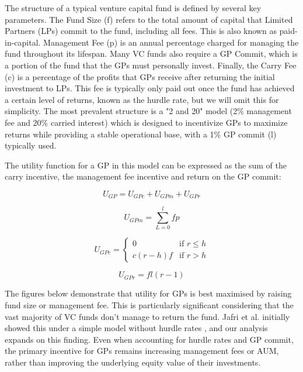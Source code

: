 \documentclass[a4paper, oneside]{discothesis}
\begin{document}
The structure of a typical venture capital fund is defined by several key parameters. The Fund Size (f) refers to the total amount of capital that Limited Partners (LPs) commit to the fund, including all fees. This is also known as paid-in-capital. Management Fee (p) is an annual percentage charged for managing the fund throughout its lifespan. Many VC funds also require a GP Commit, which is a portion of the fund that the GPs must personally invest. Finally, the Carry Fee (c) is a percentage of the profits that GPs receive after returning the initial investment to LPs. This fee is typically only paid out once the fund has achieved a certain level of returns, known as the hurdle rate, but we will omit this for simplicity. The most prevalent structure is a "2 and 20" model (2\% management fee and 20\% carried interest) which is designed to incentivize GPs to maximize returns while providing a stable operational base, with a 1\% GP commit (l) typically used. 

The utility function for a GP in this model can be expressed as the sum of the carry incentive, the management fee incentive and return on the GP commit:

\begin{equation}
U_{GP} = U_{GPc} + U_{GPm} + U_{GPr}
\end{equation}

\begin{equation}
U_{GPm} = \sum_{L=0}^l fp
\end{equation}

\begin{equation}
U_{GPc} = \begin{cases}
    0 & \text{if } r \leq h \\
    c(r-h)f & \text{if } r > h
    \end{cases}
\end{equation}

\begin{equation}
U_{GPr} = fl(r-1)
\end{equation}

The figures below demonstrate that utility for GPs is best maximised by raising fund size or management fee. This is particularly significant considering that the vast majority of VC funds don't manage to return the fund. Jafri et al. initially showed this under a simple model without hurdle rates \cite{jafri_distributed_vc}, and our analysis expands on this finding. Even when accounting for hurdle rates and GP commit, the primary incentive for GPs remains increasing management fees or AUM, rather than improving the underlying equity value of their investments.
\end{document}
